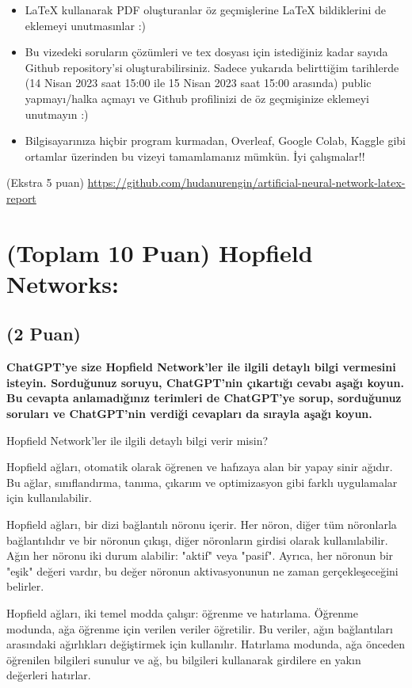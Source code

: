 \documentclass[11pt]{article}
\begin{document}
\begin{itemize}
    \item LaTeX kullanarak PDF oluşturanlar öz geçmişlerine LaTeX bildiklerini de eklemeyi unutmasınlar :)
    \item Bu vizedeki soruların çözümleri ve tex dosyası için istediğiniz kadar sayıda Github repository'si oluşturabilirsiniz. Sadece yukarıda belirttiğim tarihlerde (14 Nisan 2023 saat 15:00 ile 15 Nisan 2023 saat 15:00 arasında) public yapmayı/halka açmayı ve Github profilinizi de öz geçmişinize eklemeyi unutmayın :)
    \item Bilgisayarınıza hiçbir program kurmadan, Overleaf, Google Colab, Kaggle gibi ortamlar üzerinden bu vizeyi tamamlamanız mümkün. İyi çalışmalar!!
\end{itemize}

(Ekstra 5 puan) \url{https://github.com/hudanurengin/artificial-neural-network-latex-report}

\newpage
\section{(Toplam 10 Puan) Hopfield Networks:}

\subsection{(2 Puan)} \textbf{ChatGPT’ye size Hopfield Network’ler ile ilgili detaylı bilgi vermesini isteyin. Sorduğunuz soruyu, ChatGPT'nin çıkartığı cevabı aşağı koyun. Bu cevapta anlamadığınız terimleri de ChatGPT’ye sorup, sorduğunuz soruları ve ChatGPT’nin verdiği cevapları da sırayla aşağı koyun.}

Hopfield Network’ler ile ilgili detaylı bilgi verir misin?

Hopfield ağları, otomatik olarak öğrenen ve hafızaya alan bir yapay sinir ağıdır. Bu ağlar, sınıflandırma, tanıma, çıkarım ve optimizasyon gibi farklı uygulamalar için kullanılabilir.

Hopfield ağları, bir dizi bağlantılı nöronu içerir. Her nöron, diğer tüm nöronlarla bağlantılıdır ve bir nöronun çıkışı, diğer nöronların girdisi olarak kullanılabilir. Ağın her nöronu iki durum alabilir: "aktif" veya "pasif". Ayrıca, her nöronun bir "eşik" değeri vardır, bu değer nöronun aktivasyonunun ne zaman gerçekleşeceğini belirler.

Hopfield ağları, iki temel modda çalışır: öğrenme ve hatırlama. Öğrenme modunda, ağa öğrenme için verilen veriler öğretilir. Bu veriler, ağın bağlantıları arasındaki ağırlıkları değiştirmek için kullanılır. Hatırlama modunda, ağa önceden öğrenilen bilgileri sunulur ve ağ, bu bilgileri kullanarak girdilere en yakın değerleri hatırlar.
\end{document}
